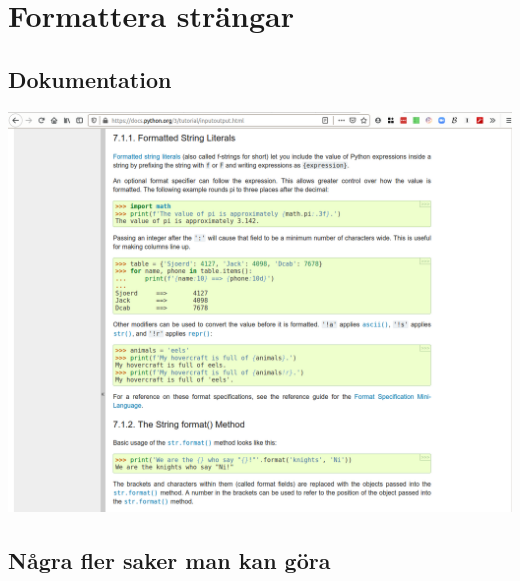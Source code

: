 \mode*

\section{Formattera strängar}

\subsection{Dokumentation}

\begin{frame}
  \includegraphics[width=\columnwidth]{figs/docs-strings.png}
\end{frame}


\subsection{Några fler saker man kan göra}

\begin{frame}
  \begin{example}[formatpi.py]
    
  \end{example}
\end{frame}

\begin{frame}
  \begin{example}[align.py]
    
  \end{example}
\end{frame}

\begin{frame}
  \begin{example}
    
  \end{example}
\end{frame}

